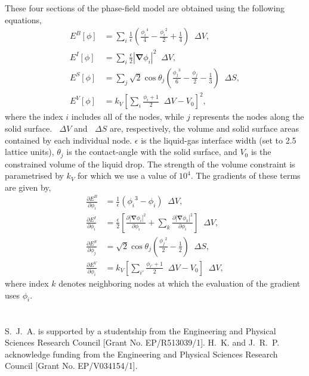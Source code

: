 \documentclass[twocolumn,10pt]{revtex4}
\newcommand{\abs}[1]{\left| #1 \right|}
\newcommand{\grad}{\bm{\nabla}}
\newcommand{\upDelta}{\mathop{}\!\Delta}
\begin{document}
These four sections of the phase-field model are obtained using the following equations,
\begin{align}
  E^B[\phi] &= \sum_i \frac{1}{\epsilon} \left( \frac{{\phi_i}^4}{4} - \frac{{\phi_i}^2}{2} + \frac{1}{4} \right) \upDelta V,\\
  E^I[\phi] &= \sum_i \frac{\epsilon}{2} \abs{\grad \phi_i}^2 \upDelta V,\\
  E^S[\phi] &= \sum_j \sqrt{2}\cos\theta_j \left( \frac{{\phi_j}^3}{6} - \frac{\phi_j}{2} - \frac{1}{3} \right) \upDelta S,\\
  E^V[\phi] &= k_V \left[ \sum_i \frac{\phi_i + 1}{2} \upDelta V - V_0 \right]^2,
\end{align}
where the index $i$ includes all of the nodes, while $j$ represents the nodes along the solid surface.
$\upDelta V$ and $\upDelta S$ are, respectively, the volume and solid surface areas contained by each individual node.
$\epsilon$ is the liquid-gas interface width (set to 2.5 lattice units), $\theta_j$ is the contact-angle with the solid surface, and $V_0$ is the constrained volume of the liquid drop.
The strength of the volume constraint is parametrised by $k_V$ for which we use a value of $10^4$.
The gradients of these terms are given by,
\begin{align}
  \frac{\partial E^B}{\partial \phi_i} &= \frac{1}{\epsilon} \left( {\phi_i}^3 - \phi_i \right) \upDelta V,\\
  \frac{\partial E^I}{\partial \phi_i} &= \frac{\epsilon}{2} \left[
    \frac{\partial \abs{\grad \phi_i}^2}{\partial \phi_i} +
    \sum_k\frac{\partial \abs{\grad \phi_k}^2}{\partial \phi_i} \right] \upDelta V,\\
  \frac{\partial E^S}{\partial \phi_j} &= \sqrt{2}\cos\theta_j \left( \frac{{\phi_j}^2}{2} - \frac{1}{2} \right) \upDelta S,\\
  \frac{\partial E^V}{\partial \phi_i} &= k_V \left[ \sum_{i'} \frac{\phi_{i'} + 1}{2} \upDelta V - V_0 \right] \upDelta V,
\end{align}
where index $k$ denotes neighboring nodes at which the evaluation of the gradient uses $\phi_i$.


\appendix
\section*{}
\begin{acknowledgments}
  S.~J.~A. is supported by a studentship from the Engineering and Physical Sciences Research Council [Grant No. EP/R513039/1].
  H.~K. and J.~R.~P. acknowledge funding from the Engineering and Physical Sciences Research Council [Grant No. EP/V034154/1].
\end{acknowledgments}
\end{document}
